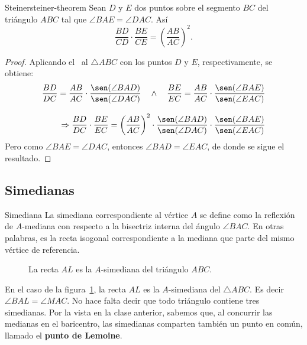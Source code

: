 \begin{section-theorem.tcb}{Steiner}{steiner-theorem}
    Sean $D$ y $E$ dos puntos sobre el segmento $BC$ del triángulo $ABC$ tal que $\angle BAE = \angle DAC$.
    Así
    \[
        \frac{BD}{CD} \cdot \frac{BE}{CE} = \left(\frac{AB}{AC}\right)^2.
    \]
\end{section-theorem.tcb}

\begin{figure}[H]
    \centering
    
\end{figure}

\begin{proof}
    Aplicando el~ al $\triangle ABC$ con los puntos $D$ y $E$, respectivamente, se obtiene:
    \begin{align*}
        \frac{BD}{DC} = \frac{AB}{AC} \cdot \frac{\sen(\angle BAD)}{\sen(\angle DAC)} \quad \land \quad
        \frac{BE}{EC} = \frac{AB}{AC} \cdot \frac{\sen(\angle BAE)}{\sen(\angle EAC)} \\[3mm]
        \Rightarrow \frac{BD}{DC} \cdot \frac{BE}{EC} = \left(\frac{AB}{AC}\right)^2 \cdot \frac{\sen(\angle BAD)}{\sen(\angle DAC)} \cdot \frac{\sen(\angle BAE)}{\sen(\angle EAC)}
    \end{align*}
    Pero como $\angle BAE = \angle DAC$, entonces $\angle BAD = \angle EAC$, de donde se sigue el resultado.
\end{proof}


\subsection{Simedianas}

\begin{section-definition.tcb}{Simediana}{}
    La simediana correspondiente al vértice $A$ se define como la reflexión de $A$\nobreakdash-mediana con respecto a la bisectriz interna del ángulo $\angle BAC$.
    En otras palabras, es la recta isogonal correspondiente a la mediana que parte del mismo vértice de referencia.
\end{section-definition.tcb}

\begin{figure}[H]
    \centering
    
    \caption{La recta $AL$ es la $A$-simediana del triángulo $ABC$.}
    \label{fig:symmedian-definition}
\end{figure}

En el caso de la figura~\ref{fig:symmedian-definition}, la recta $AL$ es la $A$-simediana del $\triangle ABC$.
Es decir $\angle BAL = \angle MAC$.
No hace falta decir que todo triángulo contiene tres simedianas.
Por la  vista en la clase anterior, sabemos que, al concurrir las medianas en el baricentro, las simedianas comparten también un punto en común, llamado el \textbf{punto de Lemoine}.



